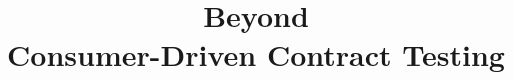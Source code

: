 \documentclass[utf8]{beamer}
\author{~}
\title{Beyond\\ Consumer-Driven Contract Testing}
\subtitle{~}
\institute{~}
\date{~}
\begin{document}
{
	\usebackgroundtemplate{} %
	\begin{frame}[t,plain]
		\titlepage
	\end{frame}
}

\end{document}
